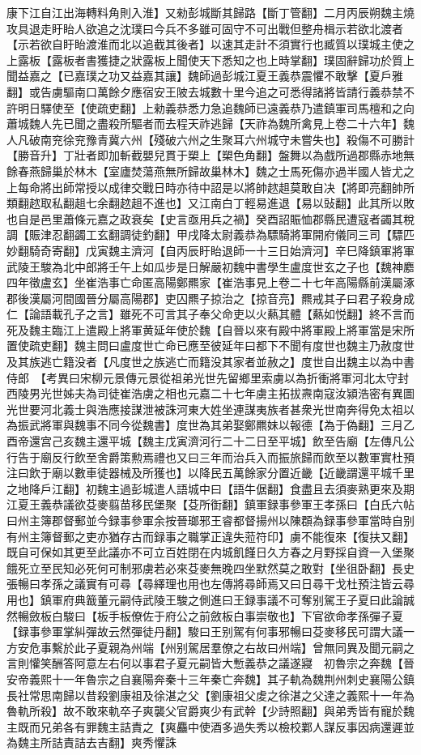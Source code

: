 康下江自江出海轉料角則入淮】又勑彭城斷其歸路【斷丁管翻】二月丙辰朔魏主燒攻具退走盱眙人欲追之沈璞曰今兵不多雖可固守不可出戰但整舟楫示若欲北渡者【示若欲自盱眙渡淮而北以追截其後者】以速其走計不須實行也臧質以璞城主使之上露板【露板者書獲捷之狀露板上聞使天下悉知之也上時掌翻】璞固辭歸功於質上聞益嘉之【已嘉璞之功又益嘉其讓】魏師過彭城江夏王義恭震懼不敢擊【夏戶雅翻】或告虜驅南口萬餘夕應宿安王陂去城數十里今追之可悉得諸將皆請行義恭禁不許明日驛使至【使疏吏翻】上勑義恭悉力急追魏師已遠義恭乃遣鎮軍司馬檀和之向蕭城魏人先已聞之盡殺所驅者而去程天祚逃歸【天祚為魏所禽見上卷二十六年】魏人凡破南兖徐兖豫青冀六州【殘破六州之生聚耳六州城守未嘗失也】殺傷不可勝計【勝音升】丁壯者即加斬截嬰兒貫于槊上【槊色角翻】盤舞以為戲所過郡縣赤地無餘春燕歸巢於林木【室廬焚蕩燕無所歸故巢林木】魏之士馬死傷亦過半國人皆尤之上每命將出師常授以成律交戰日時亦待中詔是以將帥趑趄莫敢自决【將即亮翻帥所類翻趑取私翻趄七余翻趑趄不進也】又江南白丁輕易進退【易以䜴翻】此其所以敗也自是邑里蕭條元嘉之政衰矣【史言亟用兵之禍】癸酉詔賑恤郡縣民遭寇者蠲其稅調【賑津忍翻蠲工玄翻調徒釣翻】甲戌降太尉義恭為驃騎將軍開府儀同三司【驃匹妙翻騎奇寄翻】戊寅魏主濟河【自丙辰盱眙退師一十三日始濟河】辛巳降鎮軍將軍武陵王駿為北中郎將壬午上如瓜步是日解嚴初魏中書學生盧度世玄之子也【魏神䴥四年徵盧玄】坐崔浩事亡命匿高陽鄭羆家【崔浩事見上卷二十七年高陽縣前漢屬涿郡後漢屬河間國晉分屬高陽郡】吏囚羆子掠治之【掠音亮】羆戒其子曰君子殺身成仁【論語載孔子之言】雖死不可言其子奉父命吏以火爇其體【爇如悦翻】終不言而死及魏主臨江上遣殿上將軍黄延年使於魏【自晉以來有殿中將軍殿上將軍當是宋所置使疏吏翻】魏主問曰盧度世亡命已應至彼延年曰都下不聞有度世也魏主乃赦度世及其族逃亡籍没者【凡度世之族逃亡而籍没其家者並赦之】度世自出魏主以為中書侍郎　【考異曰宋柳元景傳元景從祖弟光世先留鄉里索虜以為折衝將軍河北太守封西陵男光世姊夫為司徒崔浩虜之相也元嘉二十七年虜主拓拔燾南寇汝潁浩密有異圖光世要河北義士與浩應接謀泄被誅河東大姓坐連謀夷族者甚衆光世南奔得免太祖以為振武將軍與魏事不同今從魏書】度世為其弟娶鄭羆妹以報德【為于偽翻】三月乙酉帝還宫己亥魏主還平城【魏主戊寅濟河行二十二日至平城】飲至告廟【左傳凡公行告于廟反行飲至舍爵策勲焉禮也又曰三年而治兵入而振旅歸而飲至以數軍實杜預注曰飲于廟以數車徒器械及所獲也】以降民五萬餘家分置近畿【近畿謂還平城千里之地降戶江翻】初魏主過彭城遣人語城中曰【語牛倨翻】食盡且去須麥熟更來及期江夏王義恭議欲芟麥翦苗移民堡聚【芟所衘翻】鎮軍録事參軍王孝孫曰【白氏六帖曰州主簿郡督郵並今録事參軍余按晉瑯邪王睿都督揚州以陳頵為録事參軍當時自别有州主簿督郵之吏亦猶存古而録事之職掌正違失蒞符印】虜不能復來【復扶又翻】既自可保如其更至此議亦不可立百姓閉在内城飢饉日久方春之月野採自資一入堡聚餓死立至民知必死何可制邪虜若必來芟麥無晚四坐默然莫之敢對【坐徂卧翻】長史張暢曰孝孫之議實有可尋【尋繹理也用也左傳將尋師焉又曰日尋干戈杜預注皆云尋用也】鎮軍府典籖董元嗣侍武陵王駿之側進曰王録事議不可奪别駕王子夏曰此論誠然暢斂板白駿曰【板手板僚佐于府公之前斂板白事崇敬也】下官欲命孝孫彈子夏【録事參軍掌糾彈故云然彈徒丹翻】駿曰王别駕有何事邪暢曰芟麥移民可謂大議一方安危事繫於此子夏親為州端【州别駕居羣僚之右故曰州端】曾無同異及聞元嗣之言則懽笑酬答阿意左右何以事君子夏元嗣皆大慙義恭之議遂寢　初魯宗之奔魏【晉安帝義熙十一年魯宗之自襄陽奔秦十三年秦亡奔魏】其子軌為魏荆州刺史襄陽公鎮長社常思南歸以昔殺劉康祖及徐湛之父【劉康祖父䖍之徐湛之父達之義熙十一年為魯軌所殺】故不敢來軌卒子爽襲父官爵爽少有武幹【少詩照翻】與弟秀皆有寵於魏主既而兄弟各有罪魏主詰責之【爽麤中使酒多過失秀以檢校鄴人謀反事因病還遲並為魏主所詰責詰去吉翻】爽秀懼誅